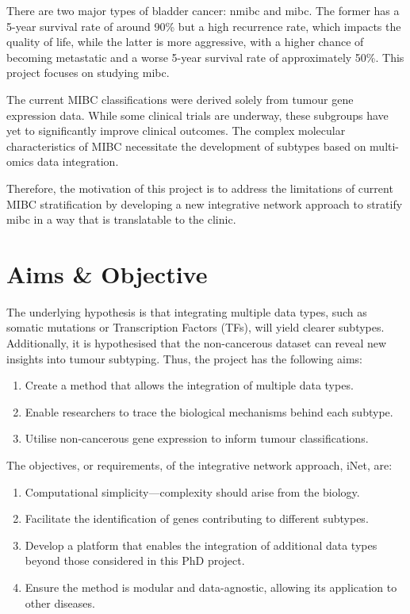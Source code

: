 There are two major types of bladder cancer: \acrfull{nmibc} and \acrfull{mibc}. The former has a 5-year survival rate of around 90\% but a high recurrence rate, which impacts the quality of life, while the latter is more aggressive, with a higher chance of becoming metastatic and a worse 5-year survival rate of approximately 50\%. This project focuses on studying \acrlong{mibc}.

The current MIBC classifications \citep{Kamoun2020-tj,Robertson2017-mg,Marzouka2018-ge} were derived solely from tumour gene expression data. While some clinical trials \citep{Griffin2024-zr} are underway, these subgroups have yet to significantly improve clinical outcomes. The complex molecular characteristics of MIBC necessitate the development of subtypes based on multi-omics data integration.

Therefore, the motivation of this project is to address the limitations of current MIBC stratification by developing a new integrative network approach to stratify \acrlong{mibc} in a way that is translatable to the clinic.


\section*{Aims \& Objective}

The underlying hypothesis is that integrating multiple data types, such as somatic mutations or Transcription Factors (TFs), will yield clearer subtypes. Additionally, it is hypothesised that the non-cancerous dataset can reveal new insights into tumour subtyping. Thus, the project has the following aims:
\begin{enumerate}
    \item Create a method that allows the integration of multiple data types.
    \item Enable researchers to trace the biological mechanisms behind each subtype.
    \item Utilise non-cancerous gene expression to inform tumour classifications.
\end{enumerate}

The objectives, or requirements, of the integrative network approach, iNet, are:

\begin{enumerate}
    \item Computational simplicity—complexity should arise from the biology.
    \item Facilitate the identification of genes contributing to different subtypes.
    \item Develop a platform that enables the integration of additional data types beyond those considered in this PhD project.
    \item Ensure the method is modular and data-agnostic, allowing its application to other diseases.
\end{enumerate}

